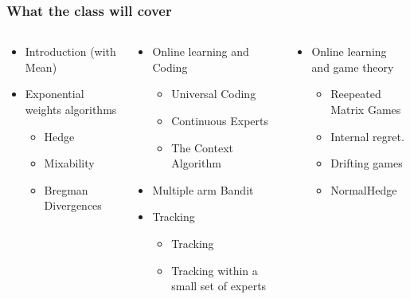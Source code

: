 \documentclass{beamer}
\begin{document}
\begin{small}
\begin{frame}
  \frametitle{What the class will cover}
  \begin{columns}
    \begin{column}[t]{3.5cm}
      \begin{itemize}
      \item Introduction (with Mean)
      \item Exponential weights algorithms
        \begin{itemize}
        \item Hedge
        \item Mixability
        \item Bregman Divergences
        \end{itemize}
      \end{itemize}
  \end{column}
  \begin{column}[t]{4.5cm}
    \begin{itemize}
    \item Online learning and Coding
      \begin{itemize}
      \item Universal Coding
      \item Continuous Experts
      \item The Context Algorithm
      \end{itemize}
    \item Multiple arm Bandit
    \item Tracking
      \begin{itemize}
      \item Tracking 
      \item Tracking within a small set of experts
      \end{itemize}
    \end{itemize}
  \end{column}
  \begin{column}[t]{4cm}
    \begin{itemize}
    \item Online learning and game theory
      \begin{itemize}
      \item Reepeated Matrix Games
      \item Internal regret.
      \item Drifting games
      \item NormalHedge
      \end{itemize}
      

\end{itemize}
\end{column}
\end{columns}
\end{frame}
\end{small}
\end{document}
